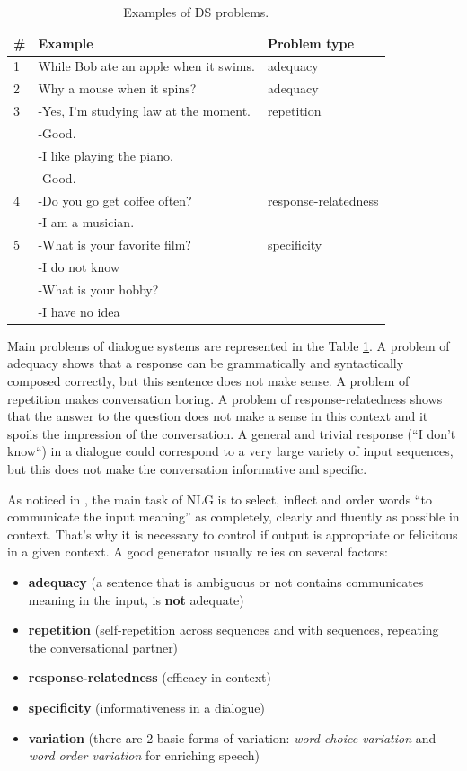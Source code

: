 \begin{table}[ht]
\centering
 \begin{tabular}{|p{0.5cm}|p{8cm}|p{4cm}|} 
 \hline
 \textbf{\#} & \textbf{Example} & \textbf{Problem type} \\
 \hline
 1 & While Bob ate an apple when it swims. & adequacy\\
 \hline
 2 & Why a mouse when it spins? & adequacy \\
 \hline
 3 & -Yes, I'm studying law at the moment. & repetition\\
   & -Good. & \\
   & -I like playing the piano. & \\
   & -Good.  & \\
\hline
4 & -Do you go get coffee often? & response-relatedness \\
  & -I am a musician. & \\
\hline
5 & -What is your favorite film? & specificity \\
  & -I do not know & \\
  & -What is your hobby? & \\
  & -I have no idea & \\
\hline
 \end{tabular}
 \caption{Examples of DS problems.}
\label{tab:ds_probs}
\end{table}
Main problems of dialogue systems are represented in the Table \ref{tab:ds_probs}. A problem of adequacy shows that a response can be grammatically and syntactically composed correctly, but this sentence does not make sense. A problem of repetition makes conversation boring. A problem of response-relatedness shows that the answer to the question does not make a sense in this context and it spoils the impression of the conversation. A general and trivial response (``I don't know``) in a dialogue could correspond to a very large variety of input sequences, but this does not make the conversation informative and specific.

As noticed in \cite{stent2005evaluating}, the main task of NLG is to select, inflect and order words ``to communicate the input meaning'' as completely, clearly and fluently as possible in context. That's why it is necessary to control if output is appropriate or felicitous in a given context. A good generator usually relies on several factors:
\begin{itemize}
  \item \textbf{adequacy} (a sentence that is ambiguous or not contains communicates meaning in the input, is \textbf{not} adequate)
  \item \textbf{repetition} (self-repetition across sequences and with sequences, repeating the conversational partner)
  \item \textbf{response-relatedness} (efficacy in context)
  \item \textbf{specificity} (informativeness in a dialogue)
  \item \textbf{variation} (there are 2 basic forms of variation: \textit{word choice variation} and \textit{word order variation} for enriching speech)
\end{itemize}


